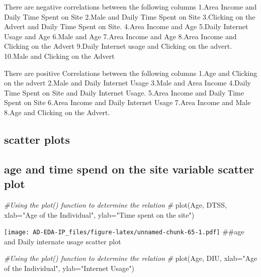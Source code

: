\documentclass[
]{article}
\newenvironment{Shaded}{\begin{snugshade}}{\end{snugshade}}
\newcommand{\AttributeTok}[1]{\textcolor[rgb]{0.77,0.63,0.00}{#1}}
\newcommand{\CommentTok}[1]{\textcolor[rgb]{0.56,0.35,0.01}{\textit{#1}}}
\newcommand{\FunctionTok}[1]{\textcolor[rgb]{0.00,0.00,0.00}{#1}}
\newcommand{\NormalTok}[1]{#1}
\newcommand{\StringTok}[1]{\textcolor[rgb]{0.31,0.60,0.02}{#1}}
\begin{document}
There are negative correlations between the following columns 1.Area
Income and Daily Time Spent on Site 2.Male and Daily Time Spent on Site
3.Clicking on the Advert and Daily Time Spent on Site. 4.Area Income and
Age 5.Daily Internet Usage and Age 6.Male and Age 7.Area Income and Age
8.Area Income and Clicking on the Advert 9.Daily Internet usage and
Clicking on the advert. 10.Male and Clicking on the Advert

There are positive Correlations between the following columns 1.Age and
Clicking on the advert 2.Male and Daily Internet Usage 3.Male and Area
Income 4.Daily Time Spent on Site and Daily Internet Usage. 5.Area
Income and Daily Time Spent on Site 6.Area Income and Daily Internet
Usage 7.Area Income and Male 8.Age and Clicking on the Advert.

\hypertarget{scatter-plots}{%
\subsection{scatter plots}\label{scatter-plots}}

\hypertarget{age-and-time-spend-on-the-site-variable-scatter-plot}{%
\subsection{age and time spend on the site variable scatter
plot}\label{age-and-time-spend-on-the-site-variable-scatter-plot}}

\begin{Shaded}
\begin{Highlighting}[]
\CommentTok{\#Using the plot() function to determine the relation }
\CommentTok{\#}
\FunctionTok{plot}\NormalTok{(Age, DTSS, }\AttributeTok{xlab=}\StringTok{"Age of the Individual"}\NormalTok{, }\AttributeTok{ylab=}\StringTok{"Time spent on the site"}\NormalTok{)}
\end{Highlighting}
\end{Shaded}

\texttt{[image: AD-EDA-IP\_files/figure-latex/unnamed-chunk-65-1.pdf]}
\#\#age and Daily internate usage scatter plot

\begin{Shaded}
\begin{Highlighting}[]
\CommentTok{\#Using the plot() function to determine the relation }
\CommentTok{\#}
\FunctionTok{plot}\NormalTok{(Age, DIU, }\AttributeTok{xlab=}\StringTok{"Age of the Individual"}\NormalTok{, }\AttributeTok{ylab=}\StringTok{"Internet Usage"}\NormalTok{)}
\end{Highlighting}
\end{Shaded}
\end{document}
